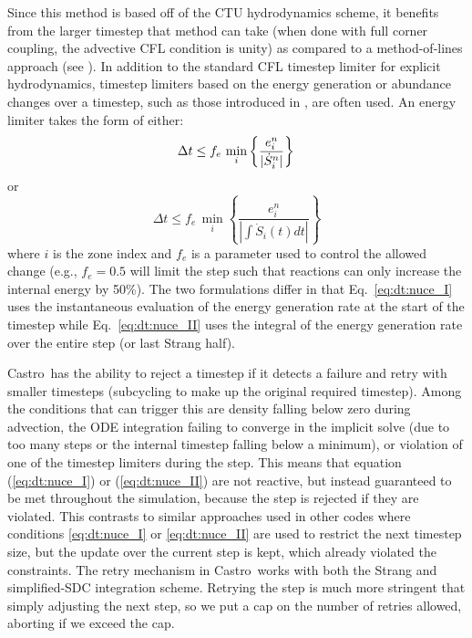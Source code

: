 \documentclass[times,preprint]{aastex63}
\newcommand{\castro}{{\sf Castro}}
\newcommand{\MarginPar}[1]{\marginpar{\vskip-\baselineskip\raggedright\tiny\sffamily\hrule\smallskip{\color{red}#1}\par\smallskip\hrule}}
\begin{document}
Since this method is based off of the CTU hydrodynamics scheme, it
benefits from the larger timestep that method can take (when done with
full corner coupling, the advective CFL condition is unity) as
compared to a method-of-lines approach (see \citealt{ppmunsplit}).  In
addition to the standard CFL timestep limiter for explicit
hydrodynamics, timestep limiters based on
the energy generation or abundance changes over a timestep, such as
those introduced in \cite{prometheus}, are often used.  An energy limiter takes the
form of either:
\begin{equation}
\label{eq:dt:nuce_I}
\Delta t \le f_e\, \min_{i} \left\{\frac{e^n_{i}}{|\dot{S}_{i}^n|}\right\} \\
\end{equation}
or
\begin{equation}
\label{eq:dt:nuce_II}
\Delta t \le f_e\, \min_{i} \left\{ \frac{e^n_i}{|\int \dot{S}_i(t) dt|} \right\}
\end{equation}
where $i$ is the zone index and $f_e$ is a parameter used to control
the allowed change (e.g., $f_e = 0.5$ will limit the step such that
reactions can only increase the internal energy by 50\%).  The two
formulations differ in that Eq.~\ref{eq:dt:nuce_I} uses the
instantaneous evaluation of the energy generation rate at the start of
the timestep while Eq.~\ref{eq:dt:nuce_II} uses the integral of the
energy generation rate over the entire step (or last Strang half).

\castro\ has the ability to reject a timestep if it detects a failure
and retry with smaller timesteps (subcycling to make up the original
required timestep).  Among the conditions that can trigger this are
density falling below zero during advection, the ODE integration
failing to converge in the implicit solve (due to too many steps or
the internal timestep falling below a minimum), or violation of one of
the timestep limiters during the step.  This means that equation
(\ref{eq:dt:nuce_I}) or (\ref{eq:dt:nuce_II}) are not reactive, but
instead guaranteed to be met throughout the simulation, because the
step is rejected if they are violated.  This contrasts to similar
approaches used in other codes where conditions \ref{eq:dt:nuce_I} or
\ref{eq:dt:nuce_II} are used to restrict the next timestep size, but
the update over the current step is kept, which already violated the
constraints. \MarginPar{would be nice to have a reference here} The
retry mechanism in \castro\ works with both the Strang and
simplified-SDC integration scheme.  Retrying the step is much more
stringent that simply adjusting the next step, so we put a cap on the
number of retries allowed, aborting if we exceed the cap.
\end{document}
